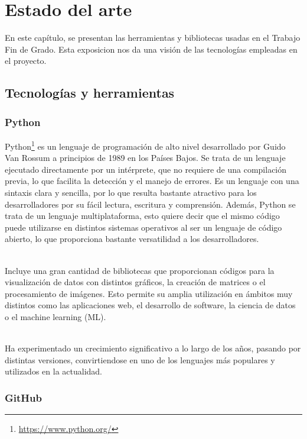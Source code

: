 \documentclass[a4paper, 12pt]{book}
\begin{document}
\cleardoublepage
\chapter{Estado del arte}
\label{chap:estado-arte}

En este capítulo, se presentan las herramientas y bibliotecas usadas en el Trabajo Fin de Grado.
Esta exposicion nos da una visión de las tecnologías empleadas en el proyecto.

\section{Tecnologías y herramientas} 
\label{sec:tecnologias-herramientas}

\subsection{Python}
\label{subsec:python}

Python\footnote{\url{https://www.python.org/}} es un lenguaje de programación de alto nivel desarrollado por Guido Van Rossum a principios de 1989 en los Países Bajos.
Se trata de un lenguaje ejecutado directamente por un intérprete, que no requiere de una compilación previa, lo que facilita la detección y el manejo de errores. 
Es un lenguaje con una sintaxis clara y sencilla, por lo que resulta bastante atractivo para los desarrolladores por su fácil lectura, escritura y comprensión.
Además, Python se trata de un lenguaje multiplataforma, esto quiere decir que el mismo código puede utilizarse en distintos sistemas operativos al ser un lenguaje de código abierto,
lo que proporciona bastante versatilidad a los desarrolladores.

\\Incluye una gran cantidad de bibliotecas que proporcionan códigos para la visualización de datos con distintos gráficos, la creación de matrices o el procesamiento de imágenes. Esto permite
su amplia utilización en ámbitos muy distintos como las aplicaciones web, el desarrollo de software, la ciencia de datos o el machine learning (ML).

\\Ha experimentado un crecimiento significativo a lo largo de los años, pasando por distintas versiones, convirtiendose en uno de los lenguajes más populares y utilizados en la actualidad.

\subsection{GitHub}
\label{subsec:github}
\end{document}
